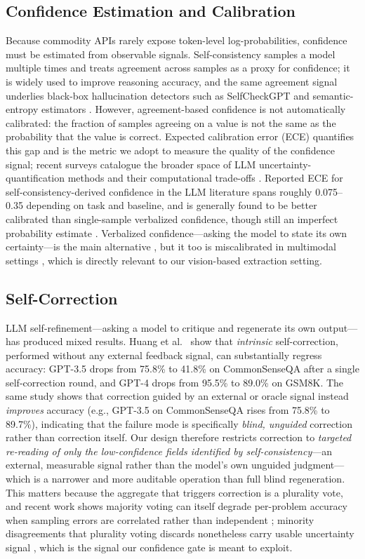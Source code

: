 \documentclass[conference]{IEEEtran}
\begin{document}
\subsection{Confidence Estimation and Calibration}
Because commodity APIs rarely expose token-level log-probabilities, confidence must be estimated from observable signals. Self-consistency \cite{b5} samples a model multiple times and treats agreement across samples as a proxy for confidence; it is widely used to improve reasoning accuracy, and the same agreement signal underlies black-box hallucination detectors such as SelfCheckGPT \cite{b12} and semantic-entropy estimators \cite{b13}. However, agreement-based confidence is not automatically calibrated: the fraction of samples agreeing on a value is not the same as the probability that the value is correct. Expected calibration error (ECE) \cite{b6} quantifies this gap and is the metric we adopt to measure the quality of the confidence signal; recent surveys catalogue the broader space of LLM uncertainty-quantification methods and their computational trade-offs \cite{b18,b19}. Reported ECE for self-consistency-derived confidence in the LLM literature spans roughly 0.075--0.35 depending on task and baseline, and is generally found to be better calibrated than single-sample verbalized confidence, though still an imperfect probability estimate \cite{b11}. Verbalized confidence---asking the model to state its own certainty---is the main alternative \cite{b14,b15}, but it too is miscalibrated in multimodal settings \cite{b20,b21}, which is directly relevant to our vision-based extraction setting.

\subsection{Self-Correction}
LLM self-refinement---asking a model to critique and regenerate its own output---has produced mixed results. Huang et al.\ \cite{b3} show that \emph{intrinsic} self-correction, performed without any external feedback signal, can substantially regress accuracy: GPT-3.5 drops from 75.8\% to 41.8\% on CommonSenseQA after a single self-correction round, and GPT-4 drops from 95.5\% to 89.0\% on GSM8K. The same study shows that correction guided by an external or oracle signal instead \emph{improves} accuracy (e.g., GPT-3.5 on CommonSenseQA rises from 75.8\% to 89.7\%), indicating that the failure mode is specifically \emph{blind, unguided} correction rather than correction itself. Our design therefore restricts correction to \emph{targeted re-reading of only the low-confidence fields identified by self-consistency}---an external, measurable signal rather than the model's own unguided judgment---which is a narrower and more auditable operation than full blind regeneration. This matters because the aggregate that triggers correction is a plurality vote, and recent work shows majority voting can itself degrade per-problem accuracy when sampling errors are correlated rather than independent \cite{b22}; minority disagreements that plurality voting discards nonetheless carry usable uncertainty signal \cite{b23}, which is the signal our confidence gate is meant to exploit.
\end{document}
